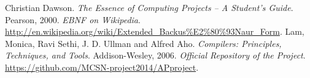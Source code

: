 \cleardoublepage  					%


\begin{thebibliography}{99}
 Christian Dawson. \emph{The Essence of Computing Projects -- A Student's Guide}. Pearson, 2000.
\emph{EBNF on Wikipedia}. \href{http:\/ \/en.wikipedia.org\/wiki\/Extended\_Backus\%E2\%80\%93Naur\_Form}{\url{http://en.wikipedia.org/wiki/Extended\_Backus\%E2\%80\%93Naur\_Form}}.
Lam, Monica, Ravi Sethi, J. D. Ullman and Alfred Aho. \emph{Compilers: Principles, Techniques, and Tools}. Addison-Wesley, 2006.
\emph{Official Repository of the Project}. \href{https:\/\/github.com\/MCSN-project2014\/APproject}{\url{https://github.com/MCSN-project2014/APproject}}.

\end{thebibliography}
